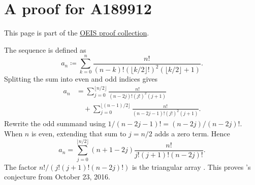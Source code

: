

\section[oeisProofA189912]{A proof for A189912}

This page is part of the \hyperref[oeisProofs]{OEIS proof collection}.

The sequence  is defined as
\[
a_n \coloneqq \sum_{k=0}^n
\frac{n!}{(n-k)! (\lfloor k/2 \rfloor!)^2 (\lfloor k/2 \rfloor +1)}.
\]
Splitting the sum into even and odd indices gives
\begin{align*}
 a_n
 &=\sum_{j=0}^{\lfloor n/2\rfloor}
   \frac{n!}{(n-2j)!(j!)^2(j+1)} \\
 &\quad+
   \sum_{j=0}^{\lfloor(n-1)/2\rfloor}
   \frac{n!}{(n-2j-1)!(j!)^2(j+1)}.
\end{align*}
Rewrite the odd summand using
$1/(n-2j-1)!=(n-2j)/(n-2j)!$.  When $n$ is even, extending that
sum to $j=n/2$ adds a zero term.  Hence
\[
 a_n=\sum_{j=0}^{\lfloor n/2\rfloor}
 (n+1-2j)\frac{n!}{j!(j+1)!(n-2j)!}.
\]
The factor
$n!/(j!(j+1)!(n-2j)!)$ is the triangular array .
This proves 's conjecture from October 23, 2016.
